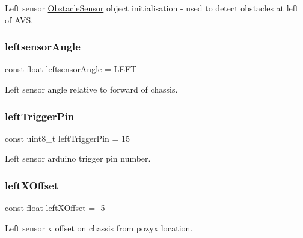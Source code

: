 Left sensor \mbox{\hyperlink{class_obstacle_sensor}{Obstacle\+Sensor}} object initialisation -\/ used to detect obstacles at left of A\+VS. 

\mbox{\label{bot_main_8ino_a8be5324bad65fa0bad41e0c70066a958}} 
\subsubsection{\texorpdfstring{leftsensor\+Angle}{leftsensorAngle}}
{\footnotesize\ttfamily const float leftsensor\+Angle = \mbox{\hyperlink{bot_main_8ino_a437ef08681e7210d6678427030446a54}{L\+E\+FT}}}



Left sensor angle relative to forward of chassis. 

\mbox{\label{bot_main_8ino_a297d5238270dc0d92e1a65b016a79f2e}} 
\subsubsection{\texorpdfstring{left\+Trigger\+Pin}{leftTriggerPin}}
{\footnotesize\ttfamily const uint8\+\_\+t left\+Trigger\+Pin = 15}



Left sensor arduino trigger pin number. 

\mbox{\label{bot_main_8ino_a2d121af61e2977de12f5bfbbe8559dca}} 
\subsubsection{\texorpdfstring{left\+X\+Offset}{leftXOffset}}
{\footnotesize\ttfamily const float left\+X\+Offset = -\/5}



Left sensor x offset on chassis from pozyx location. 

\mbox{\label{bot_main_8ino_a7be9826e4f54e376321bcdea4177a8ed}} 

